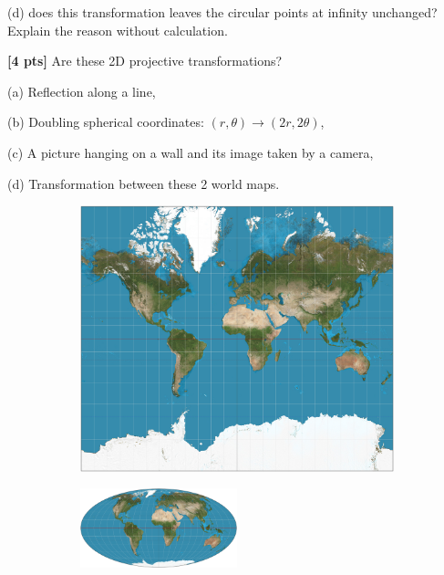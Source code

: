 \documentclass[11pt,addpoints,answers]{exam}
\numberwithin{equation}{section} %
\numberwithin{figure}{section} %
\numberwithin{table}{section} %
\begin{document}
\begin{questions}
(d) does this transformation leaves the circular points at infinity unchanged? Explain the reason without calculation.

\begin{tcolorbox}[fit,height=5cm, width=\textwidth, blank, borderline={0.5pt}{-2pt},halign=left, valign=center, nobeforeafter]


\end{tcolorbox}

\question \textbf{[4 pts]} Are these 2D projective transformations?

(a) Reflection along a line,

(b) Doubling spherical coordinates: $(r,\theta) \rightarrow (2r, 2\theta)$,

(c) A picture hanging on a wall and its image taken by a camera,

(d) Transformation between these 2 world maps.
\begin{figure}[h!]
    \centering
    \begin{subfigure}{0.48\linewidth}
        \centering
        {\includegraphics[width=0.33\linewidth]{figures/Mercator_projection_SW.jpg}}
    \end{subfigure}
    \begin{subfigure}{0.48\linewidth}
        \centering
        {\includegraphics[width=0.5\textwidth]{figures/Mollweide_projection_SW.jpg}}
    \end{subfigure}
\end{figure}

\begin{tcolorbox}[fit,height=5cm, width=\textwidth, blank, borderline={0.5pt}{-2pt},halign=left, valign=center, nobeforeafter]


\end{tcolorbox}


\end{questions}
\end{document}
